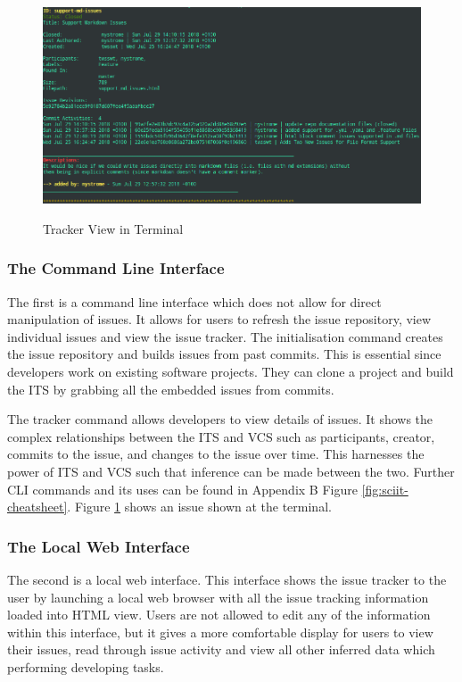 \documentclass{mproj}
\begin{document}
\begin{figure}
\centering
  \caption{Tracker View in Terminal}
  \includegraphics[width=15cm]{sciit-tracker-shot}
  \label{fig:sciit-tracker-shot}
\end{figure}

\subsubsection{The Command Line Interface}

The first is a command line interface which does not allow for direct manipulation of issues. It allows for users to refresh the issue repository, view individual issues and view the issue tracker. The initialisation command creates the issue repository and builds issues from past commits. This is essential since developers work on existing software projects. They can clone a project and build the ITS by grabbing all the embedded issues from commits. 

The tracker command allows developers to view details of issues. It shows the complex relationships between the ITS and VCS such as participants, creator, commits to the issue, and changes to the issue over time. This harnesses the power of ITS and VCS such that inference can be made between the two. Further CLI commands and its uses can be found in Appendix B Figure \ref{fig:sciit-cheatsheet}. Figure \ref{fig:sciit-tracker-shot} shows an issue shown at the terminal.

\subsubsection{The Local Web Interface}

The second is a local web interface. This interface shows the issue tracker to the user by launching a local web browser with all the issue tracking information loaded into HTML view. Users are not allowed to edit any of the information within this interface, but it gives a more comfortable display for users to view their issues, read through issue activity and view all other inferred data which performing developing tasks.
\end{document}
